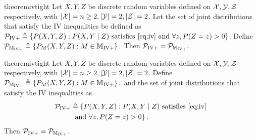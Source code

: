 \ifdefined\SINGLE
\begin{restatable}{theorem}{ivtight}\label{thm:iv_tight}
Let $X,Y,Z$ be discrete random variables defined on ${\cal X},{\cal Y},{\cal Z}$ respectively, with $|{\cal X}| = n\geq 2, |{\cal Y}|=2, |{\cal Z}| =2$. Let the set of joint distributions that satisfy the IV inequalities be defined as ${\cal P}_{\text{IV}+} \triangleq \left \lbrace P(X,Y,Z) : P(X,Y \mid Z)\text{ satisfies }\eqref{eq:iv} \text{ and } \forall z, P(Z=z)>0 \right \rbrace$. Define ${\cal P}_{\mathbb{M}_{\text{IV}+}} \triangleq \left \lbrace P_{M}(X,Y,Z) : M \in \mathbb{M}_{\text{IV}+} \right \rbrace.$ Then ${\cal P}_{\text{IV}+} = {\cal P}_{\mathbb{M}_{\text{IV}+}}.$
\end{restatable}
\else
\begin{restatable}{theorem}{ivtight}\label{thm:iv_tight}
Let $X,Y,Z$ be discrete random variables defined on ${\cal X},{\cal Y},{\cal Z}$ respectively, with $|{\cal X}| = n\geq 2, |{\cal Y}|=2, |{\cal Z}| =2$. Define ${\cal P}_{\mathbb{M}_{\text{IV}+}} \triangleq \left \lbrace P_{M}(X,Y,Z) : M \in \mathbb{M}_{\text{IV}+} \right \rbrace.$ and the set of joint distributions that satisfy the IV inequalities as \begin{align*}{\cal P}_{\text{IV}+} &\triangleq \left \lbrace P(X,Y,Z) : P(X,Y \mid Z)\text{ satisfies }\eqref{eq:iv} \right.\\
&\left.\text{ and } \forall z, P(Z=z)>0 \right \rbrace.\end{align*}  Then ${\cal P}_{\text{IV}+} = {\cal P}_{\mathbb{M}_{\text{IV}+}}.$
\end{restatable}
\fi
